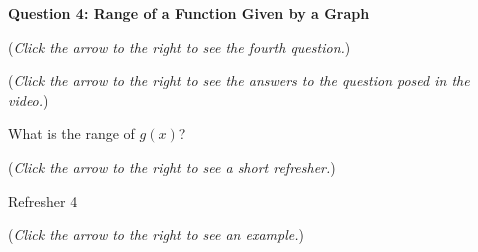 \documentclass{ximera}
\begin{document}
\textbf{Question 4: Range of a Function Given by a Graph}
\begin{question}
\begin{flushright}
{\color{blue}(\emph{Click the arrow to the right to see the fourth question.})}
\end{flushright}
\begin{center}
\begin{expandable}
{\color{blue}(\emph{Click the arrow to the right to see the answers 
to the question posed in the video.})}
\begin{expandable}
What is the range of $g(x)$?
\begin{multipleChoice}
\choice{$[-1,1)\cup(1,3]\cup[4,6]$}
\choice{$[-1,3]\cup[4,6]$}
\choice[correct]{$\{2\} \cup [6,15)$}
\choice{$\{2\}\cup [9,15)$}
\choice{$\{2\} \cup [6,9)$}
\end{multipleChoice}
\begin{flushright}
{\color{blue}(\emph{Click the arrow to the right to see a short refresher.})}
\end{flushright}
\begin{expandable}
Refresher 4
\end{expandable}
\begin{flushright}
{\color{blue}(\emph{Click the arrow to the right to see an example.})}
\end{flushright}
\begin{expandable}
\end{expandable}
\end{expandable}
\end{expandable}
\end{center}
\end{question}
\end{document}
